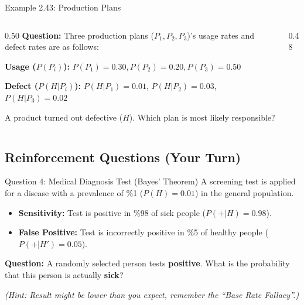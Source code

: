 \documentclass[light]{lutbeamer}
\begin{document}
\begin{frame}{Example 2.43: Production Plans}
    \begin{columns}[T]
        \begin{column}{0.50\textwidth}
            \scriptsize
            \textbf{Question:}
            Three production plans ($P_1, P_2, P_3$)'s usage rates and defect rates are as follows:

            \vspace{0.1cm}
            \textbf{Usage ($P(P_i)$):}
            $P(P_1)=0.30, P(P_2)=0.20, P(P_3)=0.50$

            \textbf{Defect ($P(H|P_i)$):}
            $P(H|P_1)=0.01$, $P(H|P_2)=0.03$, $P(H|P_3)=0.02$

            A product turned out defective ($H$). Which plan is most likely responsible?
        \end{column}
        \begin{column}{0.48\textwidth}
        \end{column}
    \end{columns}
\end{frame}



\subsection{Reinforcement Questions (Your Turn)}

\begin{frame}{Question 4: Medical Diagnosis Test (Bayes' Theorem)}
    A screening test is applied for a disease with a prevalence of \%1 ($P(H)=0.01$) in the general population.
    \begin{itemize}
        \item \textbf{Sensitivity:} Test is positive in \%98 of sick people ($P(+|H)=0.98$).
        \item \textbf{False Positive:} Test is incorrectly positive in \%5 of healthy people ($P(+|H')=0.05$).
    \end{itemize}

    \textbf{Question:} A randomly selected person tests \textbf{positive}. What is the probability that this person is actually \textbf{sick}?

    \vspace{0.2cm}
    \footnotesize
    \textit{(Hint: Result might be lower than you expect, remember the ``Base Rate Fallacy''.)}
\end{frame}
\end{document}
